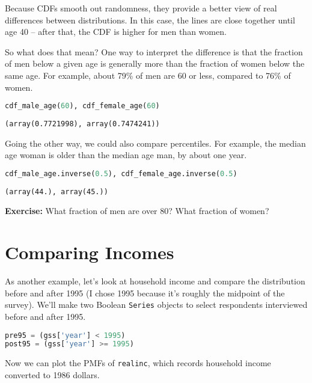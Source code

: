 Because CDFs smooth out randomness, they provide a better view of real
differences between distributions. In this case, the lines are close
together until age 40 -- after that, the CDF is higher for men than
women.

So what does that mean? One way to interpret the difference is that the
fraction of men below a given age is generally more than the fraction of
women below the same age. For example, about 79\% of men are 60 or less,
compared to 76\% of women.

\begin{lstlisting}[language=Python,style=source]
cdf_male_age(60), cdf_female_age(60)
\end{lstlisting}

\begin{lstlisting}[style=output]
(array(0.7721998), array(0.7474241))
\end{lstlisting}

Going the other way, we could also compare percentiles. For example, the
median age woman is older than the median age man, by about one year.

\begin{lstlisting}[language=Python,style=source]
cdf_male_age.inverse(0.5), cdf_female_age.inverse(0.5)
\end{lstlisting}

\begin{lstlisting}[style=output]
(array(44.), array(45.))
\end{lstlisting}

\textbf{Exercise:} What fraction of men are over 80? What fraction of
women?

\section{Comparing Incomes}\label{comparing-incomes}

As another example, let's look at household income and compare the
distribution before and after 1995 (I chose 1995 because it's roughly
the midpoint of the survey). We'll make two Boolean
\passthrough{\lstinline!Series!} objects to select respondents
interviewed before and after 1995.

\begin{lstlisting}[language=Python,style=source]
pre95 = (gss['year'] < 1995)
post95 = (gss['year'] >= 1995)
\end{lstlisting}

Now we can plot the PMFs of \passthrough{\lstinline!realinc!}, which
records household income converted to 1986 dollars.

